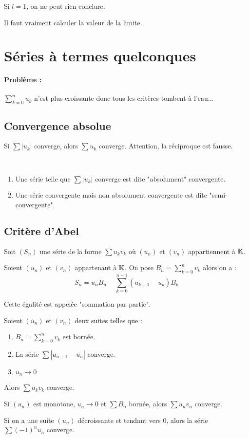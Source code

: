 \begin{rem}
Si $l=1$, on ne peut rien conclure.
\end{rem}
\begin{rem}
Il faut vraiment calculer la valeur de la limite.
\end{rem}
\section{Séries à termes quelconques}
\paragraph{Problème :} $\sum\limits_{k=0}^n u_k$ n'est plus croissante donc tous les critères tombent à l'eau...

\subsection{Convergence absolue}
\begin{thm}
Si $\sum|u_k|$ converge, alors $\sum u_k$ converge. Attention, la réciproque est fausse.
\end{thm}
\begin{defi}~
\begin{enumerate}
	\item Une série telle que $\sum |u_k|$ converge est dite "absolument" convergente.
	\item Une série convergente mais non absolument convergente est dite "semi-convergente". 
\end{enumerate}
\end{defi}

\subsection{Critère d'Abel}
Soit $(S_n)$ une série de la forme $\sum u_kv_k$ où $(u_n)$ et $(v_n)$ appartiennent à $\mathbb{K}$.

\begin{lem}
Soient $(u_n)$ et $(v_n)$ appartenant à $\mathbb{K}$. On pose $B_n=\sum\limits_{k=0}^nv_k$ alors on a :
$$S_n = u_nB_n-\sum\limits_{k=0}^{n-1}(u_{k+1}-u_k)B_k$$
\end{lem}
\begin{rem}
Cette égalité est appelée "sommation par partie".
\end{rem}

\begin{thm}
Soient $(u_n)$ et $(v_n)$ deux suites telles que :
\begin{enumerate}
	\item $B_n=\sum\limits_{k=0}^nv_k$ est bornée.
	\item La série $\sum|u_{n+1}-u_n|$ converge.
	\item $u_n\to0$
\end{enumerate}
Alors $\sum u_kv_k$ converge.
\end{thm}


\begin{rem}\end{rem}

\begin{coro}
Si $(u_n)$ est monotone, $u_n\to0$ et $\sum B_n$ bornée, alors $\sum u_nv_n$ converge.
\end{coro}
\begin{coro}
Si on a une suite $(u_n)$ décroissante et tendant vers 0, alors la série $\sum (-1)^nu_n$ converge.
\end{coro}


